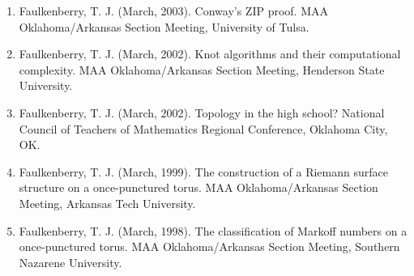 \documentclass[article,10pt]{article}
\begin{document}
\begin{enumerate}
\item Faulkenberry, T. J. (March, 2003). Conway’s ZIP proof. MAA Oklahoma/Arkansas Section Meeting, University of Tulsa.
\item Faulkenberry, T. J. (March, 2002). Knot algorithms and their computational complexity. MAA Oklahoma/Arkansas Section Meeting, Henderson State University.
\item Faulkenberry, T. J. (March, 2002). Topology in the high school? National Council of Teachers of Mathematics Regional Conference, Oklahoma City, OK.
\item Faulkenberry, T. J. (March, 1999). The construction of a Riemann surface structure on a once-punctured torus. MAA Oklahoma/Arkansas Section Meeting, Arkansas Tech University.
\item Faulkenberry, T. J. (March, 1998). The classification of Markoff numbers on a once-punctured torus. MAA Oklahoma/Arkansas Section Meeting, Southern Nazarene University.
\end{enumerate}
\end{document}
